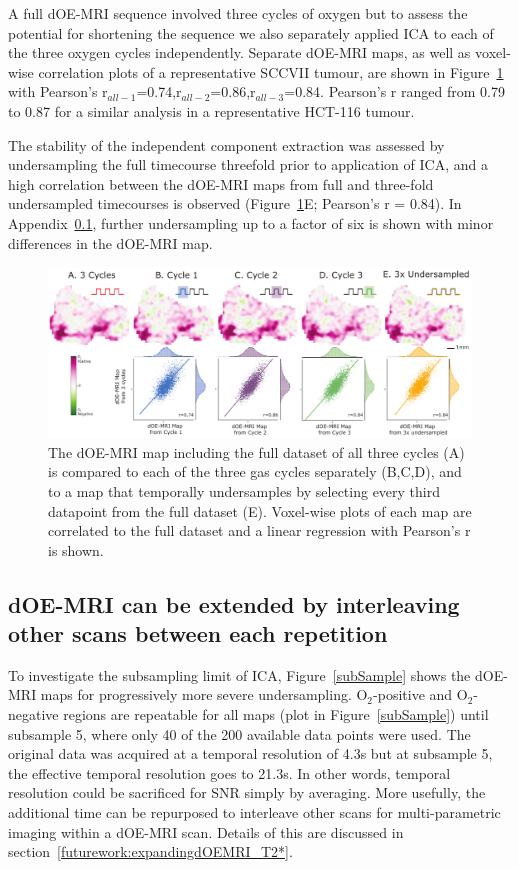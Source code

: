 A full \ac{dOE-MRI} sequence involved three cycles of oxygen but to assess the potential for shortening the sequence we also separately applied \ac{ICA} to each of the three oxygen cycles independently.
Separate \ac{dOE-MRI} maps, as well as voxel-wise correlation plots of a representative SCCVII tumour, are shown in Figure~\ref{fig_repeatability} with Pearson's r$_{all-1}$=0.74,r$_{all-2}$=0.86,r$_{all-3}$=0.84.
Pearson's r ranged from 0.79 to 0.87 for a similar analysis in a representative HCT-116 tumour.

The stability of the independent component extraction was assessed by undersampling the full timecourse threefold prior to application of \ac{ICA}, and a high correlation between the \ac{dOE-MRI} maps from full and three-fold undersampled timecourses is observed (Figure~\ref{fig_repeatability}E; Pearson's r = 0.84). 
In Appendix~\ref{sec:interleave}, further undersampling up to a factor of six is shown with minor differences in the \ac{dOE-MRI} map.

\begin{figure}[htbp]
   \centering
   \includegraphics[width=\textwidth]{oemri_thesis1/oemri_thesis1-images/fig4_repeatability.pdf} %
   \caption{The \ac{dOE-MRI} map including the full dataset of all three cycles (A) is compared to each of the three gas cycles separately (B,C,D), and to a map that temporally undersamples by selecting every third datapoint from the full dataset (E).
Voxel-wise plots of each map are correlated to the full dataset and a linear regression with Pearson's r is shown.
   \label{fig_repeatability}}
\end{figure}

\subsection{dOE-MRI can be extended by interleaving other scans between each repetition}
\label{sec:interleave}
To investigate the subsampling limit of \ac{ICA}, Figure~\ref{subSample} shows the \ac{dOE-MRI} maps for progressively more severe undersampling.
O$_2$-positive and O$_2$-negative regions are repeatable for all maps (plot in Figure~\ref{subSample}) until subsample 5, where only 40 of the 200 available data points were used.
The original data was acquired at a temporal resolution of 4.3s but at subsample 5, the effective temporal resolution goes to 21.3s. 
In other words, temporal resolution could be sacrificed for \ac{SNR} simply by averaging.
More usefully, the additional time can be repurposed to interleave other scans for multi-parametric imaging within a \ac{dOE-MRI} scan.
Details of this are discussed in section~\ref{futurework:expandingdOEMRI_T2*}. 


